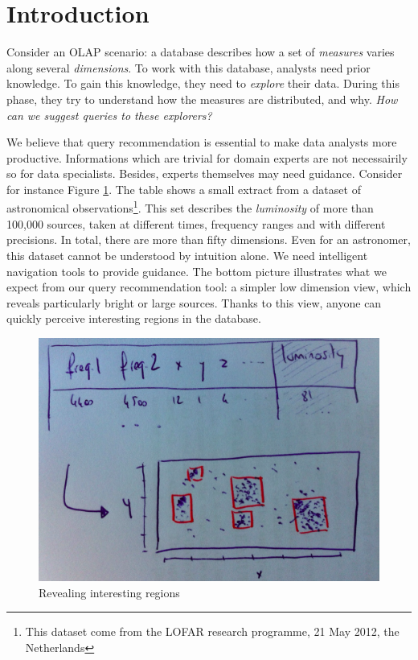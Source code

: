 \section{Introduction}
\label{sec:intro}

Consider an OLAP scenario: a database describes how a set of \emph{measures}
varies along several \emph{dimensions}.  To work with this database, analysts
need prior knowledge. To gain this knowledge, they need to \emph{explore}
their data.  During this phase, they try to understand how the
measures are distributed, and why. \emph{How can we suggest queries to
these explorers?} 

We believe that query recommendation is essential to make data analysts more
productive. Informations which are trivial for domain experts are not
necessairily so for data specialists. Besides, experts themselves may need
guidance. Consider for instance Figure \ref{intro}. The table shows a small
extract from a dataset of astronomical observations\footnote{This dataset come
from the LOFAR research programme, 21 May 2012, the Netherlands}. This set
describes the \emph{luminosity} of more than 100,000 sources, taken at
different times, frequency ranges and with different precisions. In total,
there are more than fifty dimensions. Even for an astronomer, this dataset
cannot be understood by intuition alone. We need intelligent navigation tools
to provide guidance.  The bottom picture illustrates what
we expect from our query recommendation tool: a simpler low dimension view, which reveals
particularly bright or large sources. Thanks to this view, anyone can 
quickly perceive interesting regions in the database.

\begin{figure}[t!]
\centering
\includegraphics[width=0.8\columnwidth]{images/intro}
\caption{Revealing interesting regions}
\label{intro}
\end{figure}

